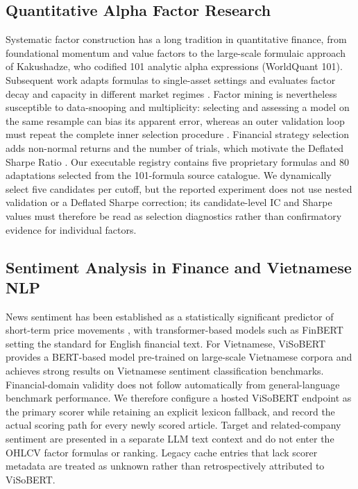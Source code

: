 \subsection{Quantitative Alpha Factor Research}

Systematic factor construction has a long tradition in quantitative finance, from foundational momentum and value factors \cite{jegadeesh1993momentum,fama1992crosssection} to the large-scale formulaic approach of Kakushadze, who codified 101 analytic alpha expressions (WorldQuant 101). Subsequent work adapts formulas to single-asset settings \cite{kang2021singleasset} and evaluates factor decay and capacity in different market regimes \cite{harvey2016,novy2016alpha}. Factor mining is nevertheless susceptible to data-snooping and multiplicity: selecting and assessing a model on the same resample can bias its apparent error, whereas an outer validation loop must repeat the complete inner selection procedure \cite{varma2006bias}. Financial strategy selection adds non-normal returns and the number of trials, which motivate the Deflated Sharpe Ratio \cite{bailey2014deflated}. Our executable registry contains five proprietary formulas and 80 adaptations selected from the 101-formula source catalogue. We dynamically select five candidates per cutoff, but the reported experiment does not use nested validation or a Deflated Sharpe correction; its candidate-level IC and Sharpe values must therefore be read as selection diagnostics rather than confirmatory evidence for individual factors.

\subsection{Sentiment Analysis in Finance and Vietnamese NLP}

News sentiment has been established as a statistically significant predictor of short-term price movements \cite{tetlock2007news}, with transformer-based models such as FinBERT \cite{araci2019finbert} setting the standard for English financial text. For Vietnamese, ViSoBERT provides a BERT-based model pre-trained on large-scale Vietnamese corpora and achieves strong results on Vietnamese sentiment classification benchmarks. Financial-domain validity does not follow automatically from general-language benchmark performance. We therefore configure a hosted ViSoBERT endpoint as the primary scorer while retaining an explicit lexicon fallback, and record the actual scoring path for every newly scored article. Target and related-company sentiment are presented in a separate LLM text context and do not enter the OHLCV factor formulas or ranking. Legacy cache entries that lack scorer metadata are treated as unknown rather than retrospectively attributed to ViSoBERT.

